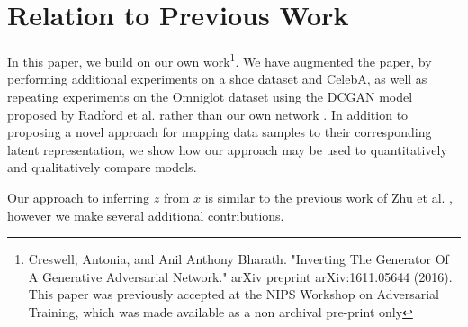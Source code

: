 \documentclass[journal]{IEEEtran}
\begin{document}


\section{Relation to Previous Work}

In this paper, we build on our own work\footnote{Creswell, Antonia, and Anil Anthony Bharath. "Inverting The Generator Of A Generative Adversarial Network." arXiv preprint arXiv:1611.05644 (2016). This paper was previously accepted at the NIPS Workshop on Adversarial Training, which was made available as a non archival pre-print only}. We have augmented the paper, by performing additional experiments on a shoe dataset \cite{luo2017learning} and CelebA, as well as repeating experiments on the Omniglot dataset using the DCGAN model proposed by Radford et al. \cite{radford2015unsupervised} rather than our own network \cite{creswell2016task}. In addition to proposing a novel approach for mapping data samples to their corresponding latent representation, we show how our approach may be used to quantitatively and qualitatively compare models.


Our approach to inferring $z$ from $x$ is similar to the previous work of Zhu et al. \cite{zhu2016generative}, however we make several additional contributions. 

\end{document}
